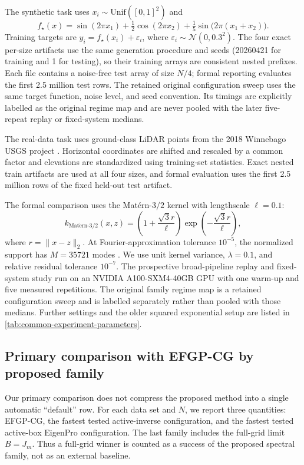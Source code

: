 The synthetic task uses \(x_i\sim\mathrm{Unif}([0,1]^2)\) and
\[
f_\star(x)=\sin(2\pi x_1)+\tfrac12\cos(2\pi x_2)
+\tfrac15\sin\!\bigl(2\pi(x_1+x_2)\bigr).
\]
Training targets are \(y_i=f_\star(x_i)+\varepsilon_i\), where
\(\varepsilon_i\sim\mathcal N(0,0.3^2)\).  The four exact per-size artifacts
use the same generation procedure and seeds (20260421 for training and 1 for
testing), so their training arrays are consistent nested prefixes.  Each file
contains a noise-free test array of size \(N/4\); formal reporting evaluates
the first 2.5 million test rows.  The retained original configuration sweep
uses the same target function, noise level, and seed convention.  Its timings
are explicitly labelled as the original regime map and are never pooled with
the later five-repeat replay or fixed-system medians.

The real-data task uses ground-class LiDAR points from the 2018 Winnebago USGS
project \cite{usgs3dep_lpc,usgs_winnebago_2018_laz}. Horizontal coordinates
are shifted and rescaled by a common factor and elevations are standardized
using training-set statistics.  Exact nested train artifacts are used at all
four sizes, and formal evaluation uses the first 2.5 million rows of the fixed
held-out test artifact.

The formal comparison uses the Mat\'ern-\(3/2\) kernel with lengthscale
\(\ell=0.1\):
\[
k_{\mathrm{Mat\acute{e}rn}\text{-}3/2}(x,z)
=\left(1+\frac{\sqrt{3}r}{\ell}\right)
\exp\!\left(-\frac{\sqrt{3}r}{\ell}\right),
\]
where \(r=\|x-z\|_2\).  At Fourier-approximation tolerance \(10^{-5}\), the
normalized support has \(M=35721\) modes
\cite{greengard2025efgp,barnett2024uniform}.  We use unit kernel variance,
\(\lambda=0.1\), and relative residual tolerance \(10^{-7}\).  The
prospective broad-pipeline replay and fixed-system study run on an NVIDIA
A100-SXM4-40GB GPU with one warm-up and five measured repetitions.  The
original family regime map is a retained configuration sweep and is labelled
separately rather than pooled with those medians.  Further settings and the
older squared exponential setup are listed in
\cref{tab:common-experiment-parameters}.
\subsection{Primary comparison with EFGP-CG by proposed family}
\label{subsec:end-to-end-krr}

Our primary comparison does not compress the proposed method into a single
automatic ``default'' row.  For each data set and $N$, we report three
quantities: EFGP-CG, the fastest tested active-inverse configuration, and the
fastest tested active-box EigenPro configuration.  The last family includes
the full-grid limit $B=J_m$.  Thus a full-grid winner is counted as a
success of the proposed spectral family, not as an external baseline.

